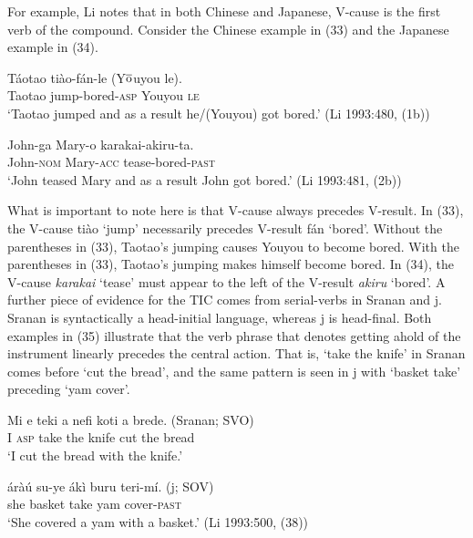 \documentclass[output=paper]{LSP/langsci}
\begin{document}
For example, Li notes that in both Chinese and Japanese, V-cause is the first verb of the compound. Consider the Chinese example in (33) and the Japanese example in (34).

 \begin{exe}
 
 \ex \gll T\'{a}otao ti\`{a}o-f\'{a}n-le (Y$\overline{\rm{o}}$uyou le).\\
 Taotao jump-bored-\textsc{asp} Youyou \textsc{le}\\
 \glt `Taotao jumped and as a result he/(Youyou) got bored.' (Li 1993:480, (1b))
 
 \ex \gll John-ga Mary-o karakai-akiru-ta.\\
 John-\textsc{nom} Mary-\textsc{acc} tease-bored-\textsc{past}\\
 \glt `John teased Mary and as a result John got bored.'  (Li 1993:481, (2b))
 
 \end{exe}

What is important to note here is that V-cause always precedes V-result. In (33), the V-cause ti\`ao `jump' necessarily precedes V-result f\'an `bored'. Without the parentheses in (33), Taotao's jumping causes Youyou to become bored. With the parentheses in (33), Taotao's jumping makes himself become bored. In (34), the V-cause \textit{karakai} `tease' must appear to the left of the V-result \textit{akiru} `bored'. A further piece of evidence for the TIC comes from serial-verbs in Sranan and j. Sranan is syntactically a head-initial language, whereas j is head-final. Both examples in (35) illustrate that the verb phrase that denotes getting ahold of the instrument linearly precedes the central action. That is, `take the knife' in Sranan comes before `cut the bread', and the same pattern is seen in j with `basket take' preceding `yam cover'.

\begin{exe}
\ex
\begin{xlist}

\ex \gll Mi e teki a nefi koti a brede. \hspace{2cm} (Sranan; SVO)\\
I \textsc{asp} take the knife cut the bread \\
\glt `I cut the bread with the knife.'

\ex \gll \'{a}r\`{a}\'{u} su-ye \'{a}k\`{i} buru teri-m\'{i}. \hspace{2.6cm} (j; SOV)\\
she basket take yam cover-\textsc{past}\\
\glt `She covered a yam with a basket.' (Li 1993:500, (38))

\end{xlist}
\end{exe}
\end{document}

